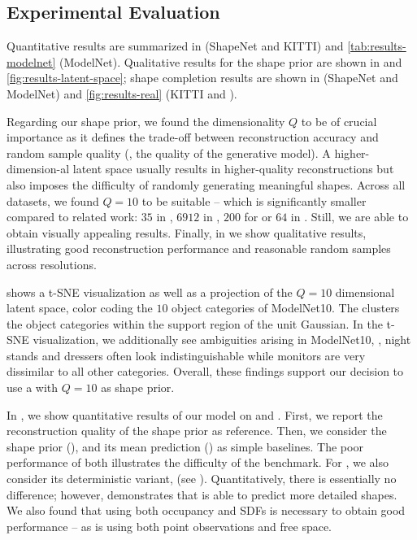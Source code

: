 






\subsection{Experimental Evaluation}
\label{sec:experiments}

Quantitative results are summarized in  (ShapeNet and KITTI) and \ref{tab:results-modelnet} (ModelNet). Qualitative results for the shape prior are shown in  and \ref{fig:results-latent-space}; shape completion results are shown in  (ShapeNet and ModelNet) and \ref{fig:results-real} (KITTI and \Kinect).

%
Regarding our \DVAE shape prior, we found the dimensionality $Q$ to be of crucial importance as it defines the trade-off between reconstruction accuracy and random sample quality (\ie, the quality of the generative model). A higher-dimension-al latent space usually results in higher-quality reconstructions but also imposes the difficulty of randomly generating meaningful shapes. Across all datasets, we found $Q = 10$ to be suitable -- which is significantly smaller compared to related work: $35$ in \citep{Liu2017ARXIV}, $6912$ in \citep{Sharma2016ARXIV}, $200$ for \citep{Wu2016NIPS,Smith2017ARXIV} or $64$ in \citep{Girdhar2016ECCV}. Still, we are able to obtain visually appealing results. Finally, in  we show qualitative results, illustrating good reconstruction performance and reasonable random samples across resolutions.

 shows a t-SNE \citep{Maaten2008JMLR} visualization as well as a projection of the $Q = 10$ dimensional latent space, color coding the $10$ object categories of ModelNet10. The \DVAE clusters the object categories within the support region of the unit Gaussian. In the t-SNE visualization, we additionally see ambiguities arising in ModelNet10, \eg, night stands and dressers often look indistinguishable while monitors are very dissimilar to all other categories. Overall, these findings support our decision to use a \DVAE with $Q=10$ as shape prior.

%
In , we show quantitative results of our model on \clean and \noisy. First, we report the reconstruction quality of the \DVAE shape prior as reference. Then, we consider the \DVAE shape prior (\BL), and its mean prediction (\M) as simple baselines. The poor performance of both illustrates the difficulty of the benchmark. For \AML, we also consider its deterministic variant, \dAML (see ). Quantitatively, there is essentially no difference; however,  demonstrates that \AML is able to predict more detailed shapes. We also found that using both occupancy and SDFs is necessary to obtain good performance -- as is using both point observations and free space.

